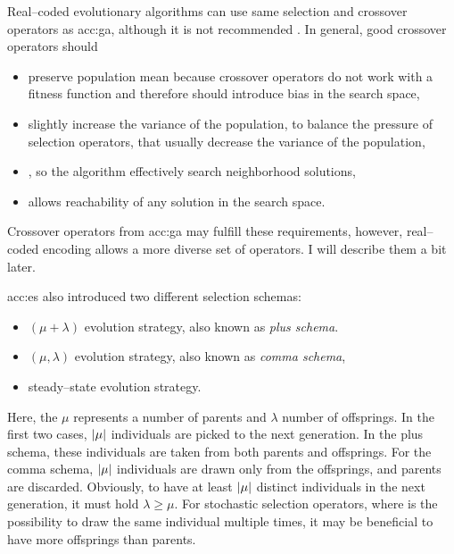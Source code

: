 Real--coded evolutionary algorithms can use same selection and crossover operators as \acrshort{acc:ga}, although it is not recommended \citet{IntroductionToEA}. In general, good crossover operators should
\begin{itemize}
    \item preserve population mean because crossover operators do not work with a fitness function and therefore should introduce bias in the search space,
    \item slightly increase the variance of the population, to balance the pressure of selection operators, that usually decrease the variance of the population,
    \item\label{enum:espopulationvariance} \snipescondition, so the algorithm effectively search neighborhood solutions,
    \item allows reachability of any solution in the search space.
\end{itemize}
Crossover operators from \acrshort{acc:ga} may fulfill these requirements, however, real--coded encoding allows a more diverse set of operators. I will describe them a bit later.

\acrshort{acc:es} also introduced two different selection schemas:
\begin{itemize}
    \item $\left(\mu+\lambda\right)$ evolution strategy, also known as \emph{plus schema}.
    \item  $\left(\mu,\lambda\right)$ evolution strategy, also known as \emph{comma schema},
    \item\label{enum:steadystate} steady--state evolution strategy.
\end{itemize}
Here, the $\mu$ represents a number of parents and $\lambda$ number of offsprings. In the first two cases, $\left|{\mu}\right|$ individuals are picked to the next generation. In the plus schema, these individuals are taken from both parents and offsprings. For the comma schema, $\left|{\mu}\right|$ individuals are drawn only from the offsprings, and parents are discarded. Obviously, to have at least $\left|{\mu}\right|$ distinct individuals in the next generation, it must hold $\lambda\geq\mu$. For stochastic selection operators, where is the possibility to draw the same individual multiple times, it may be beneficial to have more offsprings than parents.

